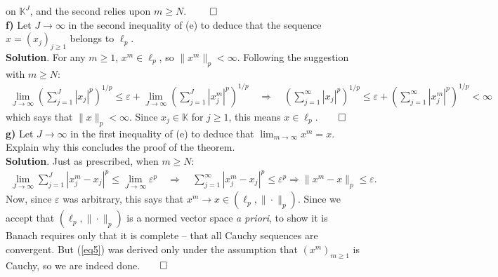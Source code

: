 \documentclass[10pt]{article}
\newcommand{\mbb}[1]{\mathbb{#1}}
\newcommand{\1}[1]{\mathbbm{1}_{#1}}
\begin{document}
    on $\mbb{K}^J$, and the second relies upon $m\geq N$. \hfill{$\qed$}\\[5pt]
    {\bf f)} Let $J\rightarrow\infty$ in the second inequality of (e) to deduce
    that the sequence $x=(x_j)_{j\geq 1}$ belongs to $\ell_p$.\\[5pt]
    {\bf Solution}. For any $m\geq 1$, $x^m\in\ell_p$, so $\|x^m\|_p<\infty$.
    Following the suggestion with $m\geq N$:
    \begin{align*}
        \lim_{J\rightarrow\infty}\left(\sum_{j=1}^J|x_j|^p\right)^{1/p}\leq\varepsilon+\lim_{J\rightarrow\infty}\left(\sum_{j=1}^J|x^m_j|^p\right)^{1/p}\quad\Rightarrow\quad \left(\sum_{j=1}^\infty|x_j|^p\right)^{1/p}\leq\varepsilon+\left(\sum_{j=1}^\infty|x_j^m|^p\right)^{1/p}<\infty
    \end{align*}
    which says that $\|x\|_p<\infty$. Since $x_j\in\mbb{K}$ for $j\geq 1$, this
    means $x\in\ell_p$.\hfill{$\qed$}\\[5pt]
    {\bf g)} Let $J\rightarrow\infty$ in the first inequality of (e) to deduce
    that $\lim_{m\rightarrow\infty}x^m=x$. Explain why this concludes the proof
    of the theorem.\\[5pt]
    {\bf Solution}. Just as prescribed, when $m\geq N$:
    \begin{align}
        \lim_{J\rightarrow\infty}\sum_{j=1}^J|x^m_j-x_j|^p\leq\lim_{J\rightarrow\infty}\varepsilon^p\quad\Rightarrow\quad\sum_{j=1}^\infty|x^m_j-x_j|^p\leq\varepsilon^p\Rightarrow\|x^m-x\|_p\leq\varepsilon.\label{eq5}
    \end{align}
    Now, since $\varepsilon$ was arbitrary, this says that $x^m\rightarrow
    x\in(\ell_p,\|\cdot\|_p)$. Since we accept that $(\ell_p,\|\cdot\|_p)$ is a
    normed vector space {\it a priori}, to show it is Banach requires only that
    it is complete -- that all Cauchy sequences are convergent. But (\ref{eq5})
    was derived only under the assumption that $(x^m)_{m\geq 1}$ is Cauchy, so
    we are indeed done.\hfill{$\qed$}
\end{document}
